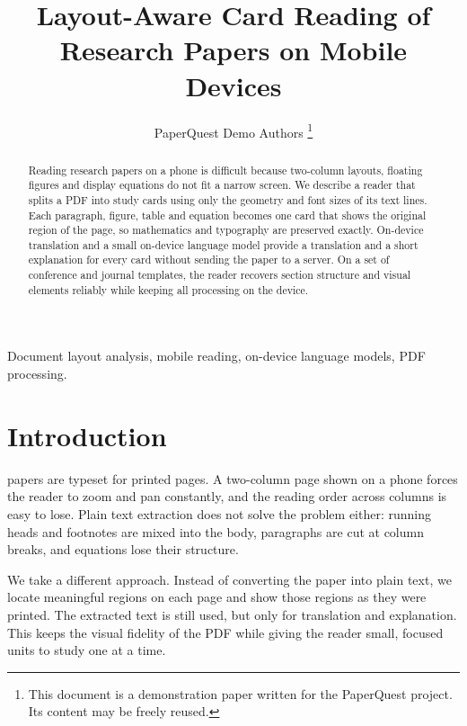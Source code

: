 \documentclass[journal]{IEEEtran}
\begin{document}
\title{Layout-Aware Card Reading of Research Papers on Mobile Devices}
\author{PaperQuest Demo Authors%
\thanks{This document is a demonstration paper written for the PaperQuest project. Its content may be freely reused.}}
\maketitle

\begin{abstract}
Reading research papers on a phone is difficult because two-column layouts, floating figures and display equations do not fit a narrow screen. We describe a reader that splits a PDF into study cards using only the geometry and font sizes of its text lines. Each paragraph, figure, table and equation becomes one card that shows the original region of the page, so mathematics and typography are preserved exactly. On-device translation and a small on-device language model provide a translation and a short explanation for every card without sending the paper to a server. On a set of conference and journal templates, the reader recovers section structure and visual elements reliably while keeping all processing on the device.
\end{abstract}

\begin{IEEEkeywords}
Document layout analysis, mobile reading, on-device language models, PDF processing.
\end{IEEEkeywords}

\section{Introduction}
 papers are typeset for printed pages. A two-column page shown on a phone forces the reader to zoom and pan constantly, and the reading order across columns is easy to lose. Plain text extraction does not solve the problem either: running heads and footnotes are mixed into the body, paragraphs are cut at column breaks, and equations lose their structure.

We take a different approach. Instead of converting the paper into plain text, we locate meaningful regions on each page and show those regions as they were printed. The extracted text is still used, but only for translation and explanation. This keeps the visual fidelity of the PDF while giving the reader small, focused units to study one at a time.
\end{document}

